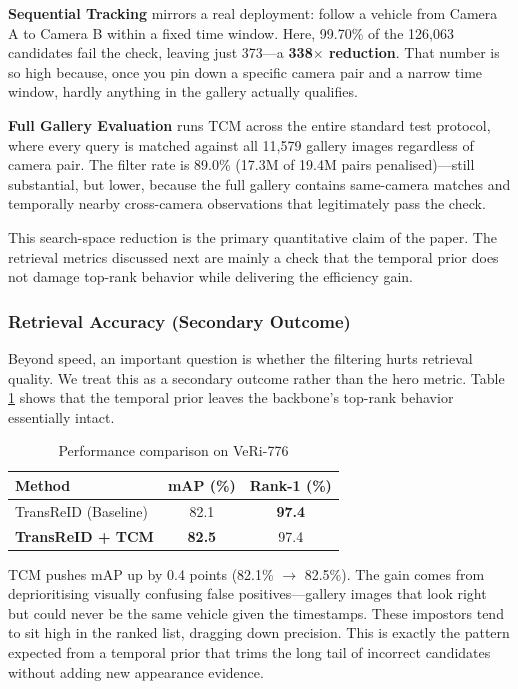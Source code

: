 \documentclass{ijitcs}
\newcommand{\rev}[1]{#1}
\begin{document}
\textbf{Sequential Tracking} mirrors a real deployment: follow a vehicle from Camera A to Camera B within a fixed time window. Here, 99.70\% of the 126,063 candidates fail the check, leaving just 373---a \textbf{338$\times$ reduction}. That number is so high because, once you pin down a specific camera pair and a narrow time window, hardly anything in the gallery actually qualifies.

\textbf{Full Gallery Evaluation} runs TCM across the entire standard test protocol, where every query is matched against all 11,579 gallery images regardless of camera pair. The filter rate is 89.0\% (17.3M of 19.4M pairs penalised)---still substantial, but lower, because the full gallery contains same-camera matches and temporally nearby cross-camera observations that legitimately pass the check.

\rev{This search-space reduction is the primary quantitative claim of the paper. The retrieval metrics discussed next are mainly a check that the temporal prior does not damage top-rank behavior while delivering the efficiency gain.}

\subsubsection{Retrieval Accuracy (Secondary Outcome)}
Beyond speed, an important question is whether the filtering hurts retrieval quality. \rev{We treat this as a secondary outcome rather than the hero metric.} Table \ref{tab:main_results} shows that the temporal prior leaves the backbone's top-rank behavior essentially intact.

\begin{table}[htbp]
\caption{Performance comparison on VeRi-776}
\begin{center}
\begin{tabular}{lcc}
\toprule
\textbf{Method} & \textbf{mAP (\%)} & \textbf{Rank-1 (\%)} \\
\midrule
TransReID (Baseline) & 82.1 & \textbf{97.4} \\
\textbf{TransReID + TCM} & \textbf{82.5} & 97.4 \\
\bottomrule
\end{tabular}
\label{tab:main_results}
\end{center}
\end{table}

TCM pushes mAP up by 0.4 points (82.1\% $\rightarrow$ 82.5\%). The gain comes from deprioritising visually confusing false positives---gallery images that look right but could never be the same vehicle given the timestamps. These impostors tend to sit high in the ranked list, dragging down precision. \rev{This is exactly the pattern expected from a temporal prior that trims the long tail of incorrect candidates without adding new appearance evidence.}
\end{document}
